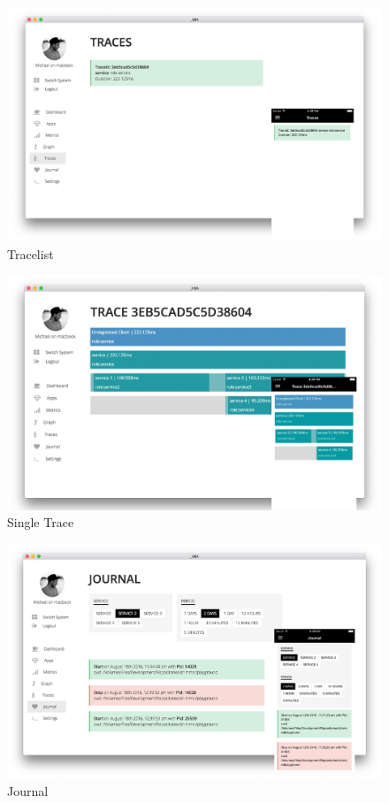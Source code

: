 \begin{figure}[h]
 \centering
 \includegraphics[width=0.9\linewidth]{appendix/app/tracelist.png}
 \caption{Tracelist}
\end{figure}

\begin{figure}[h]
 \centering
 \includegraphics[width=0.9\linewidth]{appendix/app/trace-detail.png}
 \caption{Single Trace}
\end{figure}

\begin{figure}[h]
 \centering
 \includegraphics[width=0.9\linewidth]{appendix/app/journal.png}
 \caption{Journal}
\end{figure}
